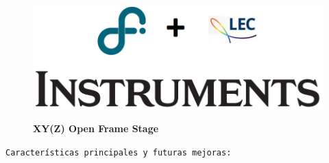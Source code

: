 \newpage
\begin{figure}[H]
\begin{minipage}{0.47\textwidth}
\centering
\includegraphics[width=.7\textwidth,left]{Figs/microespectrometro/descarga.png}
\end{minipage}
\hfill
\begin{minipage}{0.47\textwidth}
\raggedleft
\Huge \textbf{XY(Z) Open Frame Stage}
\end{minipage}
\end{figure}

\texttt{Características principales y futuras mejoras:}

